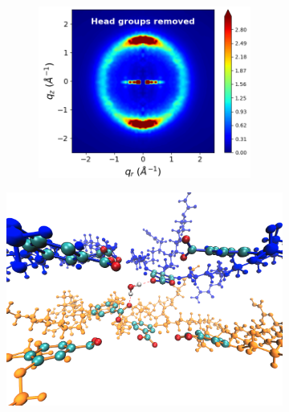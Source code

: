 \documentclass[journal=jpcbfk,manuscript=article]{achemso}
\begin{document}
  \begin{figure}[!htb]
  \begin{subfigure}{0.45\textwidth}
  \centering
  \begin{subfigure}{\textwidth}
  \includegraphics[width=\textwidth]{nophenyls_rzplot.png}
  \end{subfigure}
  \caption{}\label{fig:rdouble_nophenyls}
  \end{subfigure}
  \begin{subfigure}{0.45\textwidth}
  \centering
  \includegraphics[width=\textwidth]{hbonds_tails.png}

\end{subfigure}
\end{figure}
\end{document}
